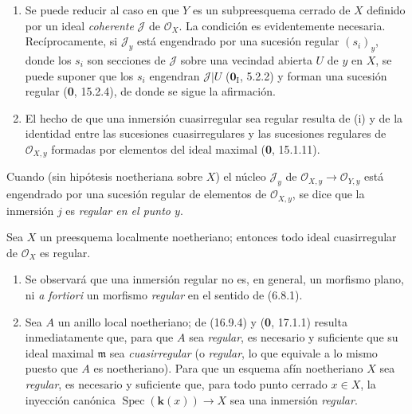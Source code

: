 \begin{enumerate}
  \item[(i)] Se puede reducir al caso en que $Y$ es un subpreesquema cerrado
  de $X$ definido por un ideal \emph{coherente} $\mathscr{J}$ de
  $\mathcal{O}_X$. La condición es evidentemente necesaria. Recíprocamente,
  si $\mathscr{J}_y$ está engendrado por una sucesión regular $(s_i)_y$, donde
  los $s_i$ son secciones de $\mathscr{J}$ sobre una vecindad abierta $U$ de
  $y$ en $X$, se puede suponer que los $s_i$ engendran $\mathscr{J}|U$
  ($\mathbf{0}_{\mathrm I}$, 5.2.2) y forman una sucesión regular (\textbf 0, 15.2.4), de
  donde se sigue la afirmación.
  \item[(ii)] El hecho de que una inmersión cuasirregular sea regular resulta
  de (i) y de la identidad entre las sucesiones cuasirregulares y las
  sucesiones regulares de $\mathcal{O}_{X,y}$ formadas por elementos del ideal
  maximal (\textbf 0, 15.1.11).
\end{enumerate}

Cuando (sin hipótesis noetheriana sobre $X$) el núcleo $\mathscr{J}_y$ de
$\mathcal{O}_{X,y}\to\mathcal{O}_{Y,y}$ está engendrado por una sucesión
regular de elementos de $\mathcal{O}_{X,y}$, se dice que la inmersión $j$ es
\emph{regular en el punto $y$}.

\begin{corollary}[16.9.11]
\label{IV.16.9.11}
Sea $X$ un preesquema localmente noetheriano; entonces todo ideal
cuasirregular de $\mathcal{O}_X$ es regular.
\end{corollary}

\begin{remarks}[16.9.12]
\label{IV.16.9.12}
\begin{enumerate}
  \item[(i)] Se observará que una inmersión regular no es, en general, un
  morfismo plano, ni \emph{a fortiori} un morfismo \emph{regular} en el sentido
  de (6.8.1).
  \item[(ii)] Sea $A$ un anillo local noetheriano; de (16.9.4) y (\textbf 0, 17.1.1)
  resulta inmediatamente que, para que $A$ sea \emph{regular}, es necesario y
  suficiente que su ideal maximal $\mathfrak{m}$ sea \emph{cuasirregular}
  (o \emph{regular}, lo que equivale a lo mismo puesto que $A$ es
  noetheriano). Para que un esquema afín noetheriano $X$ sea \emph{regular},
  es necesario y suficiente que, para todo punto cerrado $x\in X$, la
  inyección canónica $\operatorname{Spec}(\boldsymbol{k}(x))\to X$ sea una inmersión
  \emph{regular}.
\end{enumerate}
\end{remarks}

